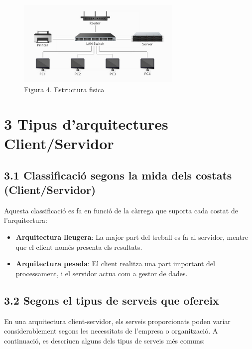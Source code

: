 \documentclass[
  a4paper,
]{article}
\providecommand{\tightlist}{%
  \setlength{\itemsep}{0pt}\setlength{\parskip}{0pt}}
\begin{document}
\begin{figure}
\centering
\includegraphics[width=0.7\textwidth,height=\textheight]{png/csXarxaFisica.png}
\caption{Figura 4. Estructura fisica}
\end{figure}

\section{3 Tipus d'arquitectures
Client/Servidor}\label{tipus-darquitectures-clientservidor}

\subsection{3.1 Classificació segons la mida dels costats
(Client/Servidor)}\label{classificaciuxf3-segons-la-mida-dels-costats-clientservidor}

Aquesta classificació es fa en funció de la càrrega que suporta cada
costat de l'arquitectura:

\begin{itemize}
\tightlist
\item
  \textbf{Arquitectura lleugera}: La major part del treball es fa al
  servidor, mentre que el client només presenta els resultats.
\item
  \textbf{Arquitectura pesada}: El client realitza una part important
  del processament, i el servidor actua com a gestor de dades.
\end{itemize}

\subsection{3.2 Segons el tipus de serveis que
ofereix}\label{segons-el-tipus-de-serveis-que-ofereix}

En una arquitectura client-servidor, els serveis proporcionats poden
variar considerablement segons les necessitats de l'empresa o
organització. A continuació, es descriuen alguns dels tipus de serveis
més comuns:
\end{document}
